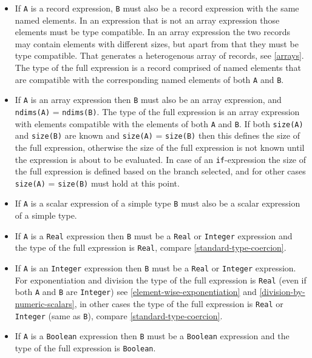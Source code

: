 \begin{itemize}
\item
  If \lstinline!A! is a record expression, \lstinline!B! must also be a record expression with the same named elements.
  In an expression that is not an array expression those elements must be type compatible.
  In an array expression the two records may contain elements with different sizes, but apart from that they must be type compatible.
  That generates a heterogenous array of records, see \cref{arrays}.
  The type of the full expression is a record comprised of named elements that are compatible with the corresponding named elements of both \lstinline!A! and \lstinline!B!.
\item
  If \lstinline!A! is an array expression then \lstinline!B! must also be an array expression, and \lstinline!ndims(A)! = \lstinline!ndims(B)!.
  The type of the full expression is an array expression with elements compatible with the elements of both \lstinline!A! and \lstinline!B!.
  If both \lstinline!size(A)! and \lstinline!size(B)! are known and \lstinline!size(A)! = \lstinline!size(B)! then this defines the size of the full expression, otherwise the size of the full expression is not known until the expression is about to be evaluated.
  In case of an \lstinline!if!-expression the size of the full expression is defined based on the branch selected, and for other cases \lstinline!size(A)! = \lstinline!size(B)! must hold at this point.
\item
  If \lstinline!A! is a scalar expression of a simple type \lstinline!B! must also be a scalar expression of a simple type.
\item
  If \lstinline!A! is a \lstinline!Real! expression then \lstinline!B! must be a \lstinline!Real! or \lstinline!Integer! expression and the type of the full expression  is \lstinline!Real!, compare \cref{standard-type-coercion}.
\item
  If \lstinline!A! is an \lstinline!Integer! expression then \lstinline!B! must be a \lstinline!Real! or \lstinline!Integer! expression.
  For exponentiation and division the type of the full expression  is \lstinline!Real! (even if both \lstinline!A! and \lstinline!B! are \lstinline!Integer!) see \cref{element-wise-exponentiation} and \cref{division-by-numeric-scalars}, in other cases the type of the full expression  is \lstinline!Real! or \lstinline!Integer! (same as \lstinline!B!), compare \cref{standard-type-coercion}.
\item
  If \lstinline!A! is a \lstinline!Boolean! expression then \lstinline!B! must be a \lstinline!Boolean! expression and the type of the full expression  is \lstinline!Boolean!.

\end{itemize}
